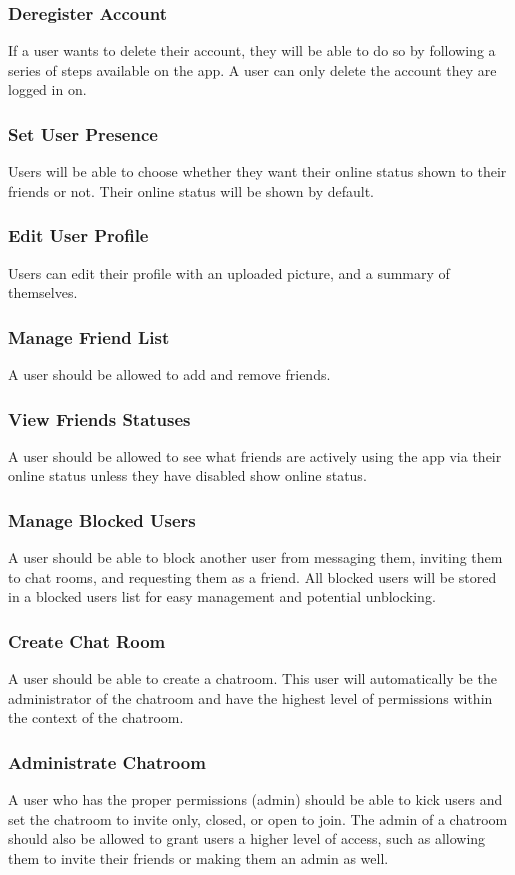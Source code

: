 \documentclass[11pt]{article}
\theoremstyle{plain}
\theoremstyle{definition}
\begin{document}
\subsubsection{Deregister Account}
If a user wants to delete their account, they will be able to do so by following a series of steps available on the app. A user can only delete the account they are logged in on.
\subsubsection{Set User Presence}
Users will be able to choose whether they want their online status shown to their friends or not. Their online status will be shown by default.
\subsubsection{Edit User Profile}
Users can edit their profile with an uploaded picture, and a summary of themselves.
\subsubsection{Manage Friend List}
A user should be allowed to add and remove friends.
\subsubsection{View Friends Statuses}
A user should be allowed to see what friends are actively using the app via their online status unless they have disabled show online status.
\subsubsection{Manage Blocked Users}
A user should be able to block another user from messaging them, inviting them to chat rooms, and requesting them as a friend. All blocked users will be stored in a blocked users list for easy management and potential unblocking. 
\subsubsection{Create Chat Room}
A user should be able to create a chatroom. This user will automatically be the administrator of the chatroom and have the highest level of permissions within the context of the chatroom.
\subsubsection{Administrate Chatroom}
A user who has the proper permissions (admin) should be able to kick users and set the chatroom to invite only, closed, or open to join. The admin of a chatroom should also be allowed to grant users a higher level of access, such as allowing them to invite their friends or making them an admin as well.
\end{document}
